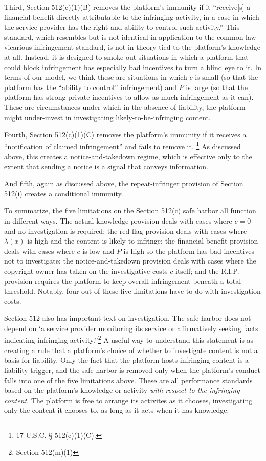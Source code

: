 Third, Section 512(c)(1)(B) removes the platform's immunity if it ``receive[s] a financial benefit directly attributable to the infringing activity, in a case in which the service provider has the right and ability to control such activity.'' This standard, which resembles but is not identical in application to the common-law vicarious-infringement standard, is not in theory tied to the platform's knowledge at all. Instead, it is designed to smoke out situations in which a platform that could block infringement has especially bad incentives to turn a blind eye to it. In terms of our model, we think these are situations in which $c$ is small (so that the platform has the ``ability to control'' infringement) and $P$ is large (so that the platform has strong private incentives to allow as much infringement as it can). These are circumstances under which in the absence of liability, the platform might under-invest in investigating likely-to-be-infringing content.

Fourth, Section 512(c)(1)(C) removes the platform's immunity if it receives a ``notification of claimed infringement'' and fails to remove it.
\footnote{17 U.S.C. § 512(c)(1)(C).} As discussed above, this creates a notice-and-takedown regime, which is effective only to the extent that sending a notice is a signal that conveys information.

And fifth, again as discussed above, the repeat-infringer provision of Section 512(i) creates a conditional immunity.

To summarize, the five limitations on the Section 512(c) safe harbor all function in different ways. The actual-knowledge provision deals with cases where $c = 0$ and no investigation is required; the red-flag provision deals with cases where $\lambda(x)$ is high and the content is likely to infringe; the financial-benefit provision deals with cases where $c$ is low and $P$ is high so the platform has bad incentives not to investigate; the notice-and-takedown provision deals with cases where the copyright owner has taken on the investigative costs $c$ itself; and the R.I.P. provision requires the platform to keep overall infringement beneath a total threshold. Notably, four out of these five limitations have to do with investigation costs.

Section 512 also has important text on investigation. The safe harbor does not depend on `a service provider monitoring its service or affirmatively seeking facts indicating infringing activity.''\footnote{Section 512(m)(1)} A useful way to understand this statement is as creating a rule that a platform's choice of whether to investigate content is not a basis for liability. Only the fact that the platform hosts infringing content is a liability trigger, and the safe harbor is removed only when the platform's conduct falls into  one of the five limitations above. These are all performance standards based on the platform's knowledge or activity \emph{with respect to the infringing content}. The platform is free to arrange its activites as it chooses, investigating only the content it chooses to, as long as it acts when it has knowledge.

